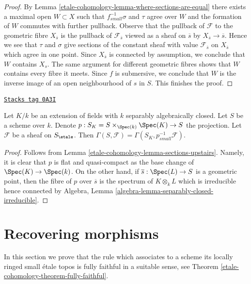\begin{proof}
\medskip\noindent
By Lemma \ref{etale-cohomology-lemma-where-sections-are-equal}
there exists a maximal open $W \subset X$ such that
$f_{small}^{-1}\sigma$ and $\tau$ agree over $W$
and the formation of $W$ commutes with further pullback.
Observe that the pullback of $\mathcal{F}$ to the
geometric fibre $X_{\overline{s}}$ is the pullback
of $\mathcal{F}_{\overline{s}}$ viewed as a sheaf on
$\overline{s}$ by $X_{\overline{s}} \to \overline{s}$.
Hence we see that $\tau$ and $\sigma$ give sections
of the constant sheaf with value $\mathcal{F}_{\overline{s}}$
on $X_{\overline{s}}$ which agree in one point. Since
$X_{\overline{s}}$ is connected by assumption, we conclude
that $W$ contains $X_s$. The same argument for different
geometric fibres shows that $W$ contains every fibre it meets.
Since $f$ is submersive, we conclude that $W$ is the inverse
image of an open neighbourhood of $s$ in $S$.
This finishes the proof.
\end{proof}

\begin{lemma}
\label{etale-cohomology-lemma-sections-base-field-extension}
\href{https://stacks.math.columbia.edu/tag/0A3I}{\texttt{Stacks tag 0A3I}}

Let $K/k$ be an extension of fields with $k$ separably
algebraically closed. Let $S$ be a scheme over $k$. Denote
$p : S_K = S \times_{\Spec(k)} \Spec(K) \to S$ the projection.
Let $\mathcal{F}$ be a sheaf on $S_\etale$.
Then $\Gamma(S, \mathcal{F}) = \Gamma(S_K, p^{-1}_{small}\mathcal{F})$.
\end{lemma}

\begin{proof}
Follows from Lemma \ref{etale-cohomology-lemma-sections-upstairs}. Namely, it is clear
that $p$ is flat and quasi-compact as the base change of
$\Spec(K) \to \Spec(k)$. On the other hand, if $\overline{s} : \Spec(L) \to S$
is a geometric point, then the fibre of $p$ over $\overline{s}$
is the spectrum of $K \otimes_k L$ which is irreducible hence connected by
Algebra, Lemma \ref{algebra-lemma-separably-closed-irreducible}.
\end{proof}

\section{Recovering morphisms}
\label{etale-cohomology-section-morphisms}
In this section we prove that the rule which associates to a scheme
its locally ringed small \'etale topos is fully faithful in a suitable
sense, see
Theorem \ref{etale-cohomology-theorem-fully-faithful}.


